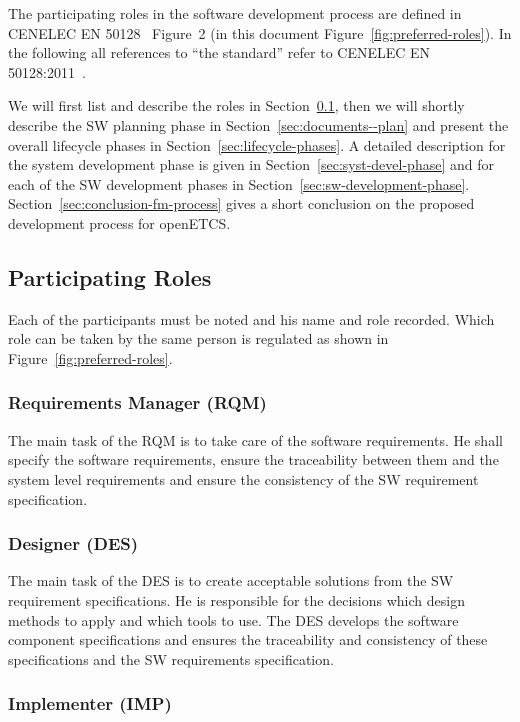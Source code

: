 
The participating roles in the software development process are defined in
CENELEC EN 50128~\cite{EN-50128} Figure~2 (in this document
Figure~\ref{fig:preferred-roles}). In the following all references to ``the
standard'' refer to CENELEC EN 50128:2011~\cite{EN-50128}.

We will first list and describe the roles in
Section~\ref{sec:participating-roles}, then we will shortly describe the SW
planning phase in Section~\ref{sec:documents--plan} and present the overall
lifecycle phases in Section~\ref{sec:lifecycle-phases}. A detailed description
for the system development phase is given in Section~\ref{sec:syst-devel-phase}
and for each of the SW development phases in
Section~\ref{sec:sw-development-phase}. Section~\ref{sec:conclusion-fm-process}
gives a short conclusion on the proposed development process for openETCS.

\subsection{Participating Roles}
\label{sec:participating-roles}

Each of the participants must be noted and his name and role recorded. Which
role can be taken by the same person is regulated as shown in
Figure~\ref{fig:preferred-roles}.

\subsubsection{Requirements Manager (RQM)}
\label{sec:requ-magang-rqm}

The main task of the RQM is to take care of the software requirements. He shall
specify the software requirements, ensure the traceability between them and the
system level requirements and ensure the consistency of the SW requirement
specification.

\subsubsection{Designer (DES)}
\label{sec:designer}

The main task of the DES is to create acceptable solutions from the SW
requirement specifications. He is responsible for the decisions which design
methods to apply and which tools to use. The DES develops the software component
specifications and ensures the traceability and consistency of these
specifications and the SW requirements specification.

\subsubsection{Implementer (IMP)}
\label{sec:implementer}


